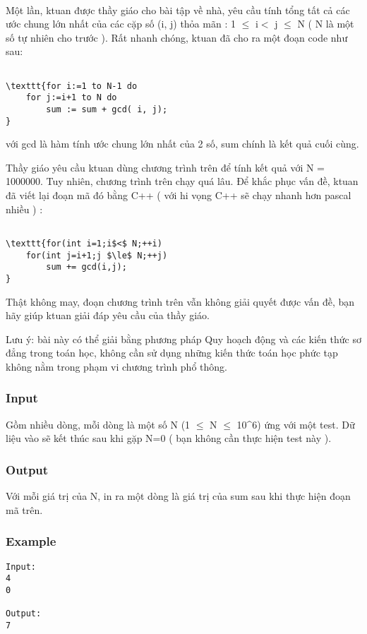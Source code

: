 

 

Một lần, ktuan được thầy giáo cho bài tập về nhà, yêu cầu tính tổng tất cả các ước chung lớn nhất của các cặp số (i, j) thỏa mãn : 1 $\le$ i$<$ j $\le$ N ( N là một số tự nhiên cho trước ). Rất nhanh chóng, ktuan đã cho ra một đoạn code như sau:
\begin{verbatim}

\texttt{for i:=1 to N-1 do
    for j:=i+1 to N do
        sum := sum + gcd( i, j);
}\end{verbatim}







với gcd là hàm tính ước chung lớn nhất của 2 số, sum chính là kết quả cuối cùng.


Thầy giáo yêu cầu ktuan dùng chương trình trên để tính kết quả với N = 1000000. Tuy nhiên, chương trình trên chạy quá lâu. Để khắc phục vấn đề, ktuan đã viết lại đoạn mã đó bằng C++ ( với hi vọng C++ sẽ chạy nhanh hơn pascal nhiều ) :
\begin{verbatim}

\texttt{for(int i=1;i$<$ N;++i)
    for(int j=i+1;j $\le$ N;++j)
        sum += gcd(i,j);
}\end{verbatim}




Thật không may, đoạn chương trình trên vẫn không giải quyết được vấn đề, bạn hãy giúp ktuan giải đáp yêu cầu của thầy giáo.





Lưu ý: bài này có thể giải bằng phương pháp Quy hoạch động và các kiến thức sơ đẳng trong toán học, không cần sử dụng những kiến thức toán học phức tạp không nằm trong phạm vi chương trình phổ thông.

\subsubsection{Input}

Gồm nhiều dòng, mỗi dòng là một số N (1  $\le$  N  $\le$  10^6) ứng với một test. Dữ liệu vào sẽ kết thúc sau khi gặp N=0 ( bạn không cần thực hiện test này ).

\subsubsection{Output}

Với mỗi giá trị của N, in ra một dòng là giá trị của sum sau khi thực hiện đoạn mã trên.

\subsubsection{Example}
\begin{verbatim}
Input:
4
0

Output:
7
\end{verbatim}
